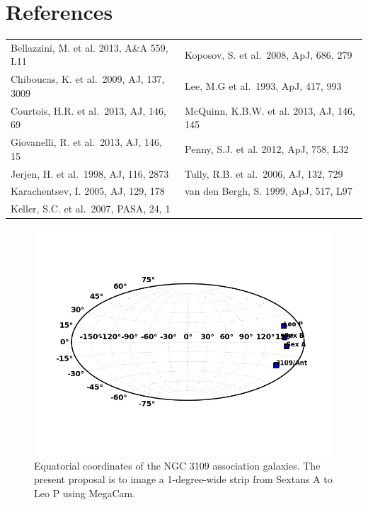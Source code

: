 \documentclass[12pt]{article}
\begin{document}
\clearpage

\section*{References}

\begin{table}[h]
\begin{tabular}{ll}
Bellazzini, M. et al.  2013, A\&A 559, L11 & Koposov, S. et al.\ 2008, ApJ, 686, 279\\
Chiboucas, K. et al.\  2009, AJ, 137, 3009 & Lee, M.G et al.\ 1993, ApJ, 417, 993\\
Courtois, H.R. et al.\ 2013, AJ, 146, 69 &  McQuinn, K.B.W. et al. 2013, AJ, 146, 145\\
Giovanelli, R. et al.\ 2013, AJ, 146, 15 & Penny, S.J. et al. 2012, ApJ, 758, L32\\
Jerjen, H. et al.\ 1998, AJ, 116, 2873  &  Tully, R.B. et al.\ 2006, AJ, 132, 729\\
Karachentsev, I. 2005, AJ, 129, 178 &van den Bergh, S. 1999, ApJ, 517, L97\\
Keller, S.C. et al.\ 2007, PASA, 24, 1\\
\end{tabular}
\end{table}



\begin{figure}
\caption{Equatorial coordinates of the NGC 3109 association galaxies. The present proposal is to image
a 1-degree-wide strip from Sextans A to Leo P using MegaCam.}
\includegraphics[scale=0.7]{n3109_group_sky}

\end{figure}
\end{document}
